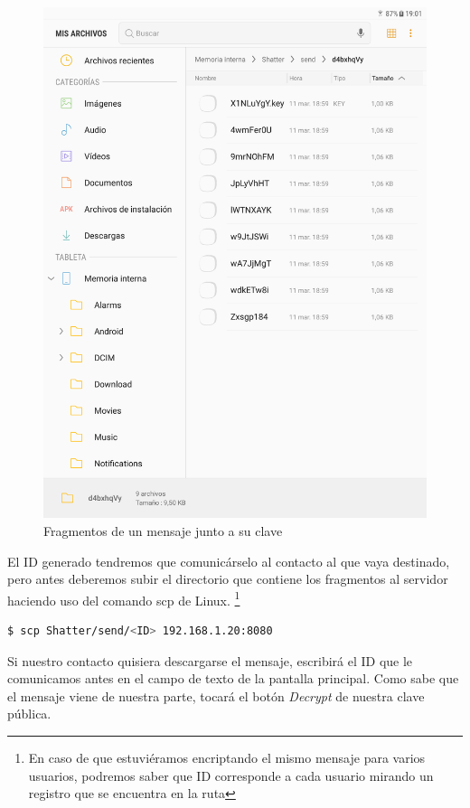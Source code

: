 \begin{figure}[ht]
  \centering
  \includegraphics[scale=0.2]{Figures/encfiles}
  \decoRule
  \caption[Shatter (Mensaje fragmentado)]{Fragmentos de un mensaje junto a su
  clave}
  \label{fig:encfiles}
\end{figure}

El ID generado tendremos que comunicárselo al contacto al que vaya destinado,
pero antes deberemos subir el directorio que contiene los fragmentos al servidor
haciendo uso del comando scp de Linux. \footnote{En caso de que estuviéramos
encriptando el mismo mensaje para varios usuarios, podremos saber que ID
corresponde a cada usuario mirando un registro que se encuentra en la ruta
}

\begin{lstlisting}[language=bash]
  $ scp Shatter/send/<ID> 192.168.1.20:8080
\end{lstlisting}

Si nuestro contacto quisiera descargarse el mensaje, escribirá el ID que le
comunicamos antes en el campo de texto de la pantalla principal. Como sabe que
el mensaje viene de nuestra parte, tocará el botón \emph{Decrypt} de nuestra
clave pública.

